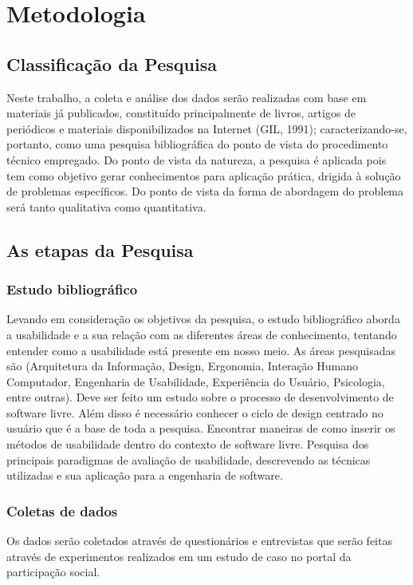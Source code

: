 \section{Metodologia}

\subsection{Classificação da Pesquisa}

Neste trabalho, a coleta e análise dos dados serão realizadas com base em  materiais já publicados, constituído principalmente de livros, artigos de periódicos e  materiais disponibilizados na Internet (GIL, 1991); caracterizando-se, portanto, como uma pesquisa bibliográfica do ponto de vista do procedimento técnico empregado. 
Do ponto de vista da natureza, a pesquisa é aplicada pois tem como objetivo gerar conhecimentos para aplicação prática, drigida à solução de problemas específicos. Do ponto de vista da forma de abordagem do problema será tanto qualitativa como quantitativa.

\subsection{As etapas da Pesquisa}

\subsubsection{Estudo bibliográfico}

	Levando em consideração os objetivos da pesquisa, o estudo bibliográfico aborda a usabilidade e a sua relação com as diferentes áreas de conhecimento, tentando entender como a usabilidade está presente em nosso meio. As áreas pesquisadas são (Arquitetura da Informação, Design, Ergonomia, Interação Humano Computador, Engenharia de Usabilidade, Experiência do Usuário, Psicologia, entre outras). Deve ser feito um estudo sobre o processo  de desenvolvimento de software livre. Além disso é necessário conhecer o ciclo de design centrado no usuário que é a base de toda a pesquisa. Encontrar maneiras de como inserir os métodos de usabilidade dentro do contexto de software livre. 
	Pesquisa dos principais paradigmas de avaliação de usabilidade, descrevendo as técnicas utilizadas e sua aplicação para a engenharia de software.

\subsubsection{Coletas de dados}

	Os dados serão coletados através de questionários e entrevistas que serão feitas através de experimentos realizados em um estudo de caso no portal da participação social.



